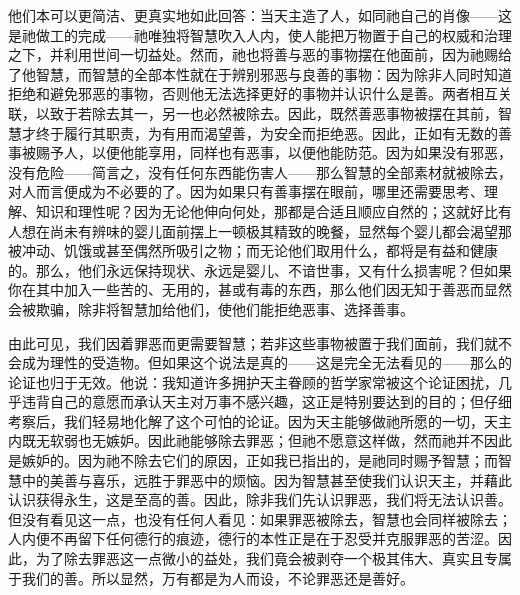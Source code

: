 他们本可以更简洁、更真实地如此回答：当天主造了人，如同祂自己的肖像——这是祂做工的完成——祂唯独将智慧吹入人内，使人能把万物置于自己的权威和治理之下，并利用世间一切益处。然而，祂也将善与恶的事物摆在他面前，因为祂赐给了他智慧，而智慧的全部本性就在于辨别邪恶与良善的事物：因为除非人同时知道拒绝和避免邪恶的事物，否则他无法选择更好的事物并认识什么是善。两者相互关联，以致于若除去其一，另一也必然被除去。因此，既然善恶事物被摆在其前，智慧才终于履行其职责，为有用而渴望善，为安全而拒绝恶。因此，正如有无数的善事被赐予人，以便他能享用，同样也有恶事，以便他能防范。因为如果没有邪恶，没有危险——简言之，没有任何东西能伤害人——那么智慧的全部素材就被除去，对人而言便成为不必要的了。因为如果只有善事摆在眼前，哪里还需要思考、理解、知识和理性呢？因为无论他伸向何处，那都是合适且顺应自然的；这就好比有人想在尚未有辨味的婴儿面前摆上一顿极其精致的晚餐，显然每个婴儿都会渴望那被冲动、饥饿或甚至偶然所吸引之物；而无论他们取用什么，都将是有益和健康的。那么，他们永远保持现状、永远是婴儿、不谙世事，又有什么损害呢？但如果你在其中加入一些苦的、无用的，甚或有毒的东西，那么他们因无知于善恶而显然会被欺骗，除非将智慧加给他们，使他们能拒绝恶事、选择善事。\par

由此可见，我们因着罪恶而更需要智慧；若非这些事物被置于我们面前，我们就不会成为理性的受造物。但如果这个说法是真的——这是完全无法看见的——那么的论证也归于无效。他说：我知道许多拥护天主眷顾的哲学家常被这个论证困扰，几乎违背自己的意愿而承认天主对万事不感兴趣，这正是特别要达到的目的；但仔细考察后，我们轻易地化解了这个可怕的论证。因为天主能够做祂所愿的一切，天主内既无软弱也无嫉妒。因此祂能够除去罪恶；但祂不愿意这样做，然而祂并不因此是嫉妒的。因为祂不除去它们的原因，正如我已指出的，是祂同时赐予智慧；而智慧中的美善与喜乐，远胜于罪恶中的烦恼。因为智慧甚至使我们认识天主，并藉此认识获得永生，这是至高的善。因此，除非我们先认识罪恶，我们将无法认识善。但没有看见这一点，也没有任何人看见：如果罪恶被除去，智慧也会同样被除去；人内便不再留下任何德行的痕迹，德行的本性正是在于忍受并克服罪恶的苦涩。因此，为了除去罪恶这一点微小的益处，我们竟会被剥夺一个极其伟大、真实且专属于我们的善。所以显然，万有都是为人而设，不论罪恶还是善好。\par

